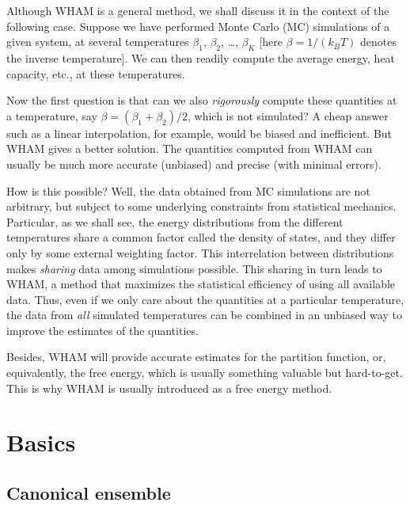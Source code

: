 \documentclass[aip,jcp,preprint,superscriptaddress]{revtex4-1}
\begin{document}
Although WHAM is a general method,
we shall discuss it in the context of the following case\cite{
ferrenberg1988, *ferrenberg1989, newman}.
%
Suppose we have performed Monte Carlo (MC) simulations of a given system,
at several temperatures $\beta_1$, $\beta_2$, \dots, $\beta_K$
%
[here $\beta = 1/(k_B T)$ denotes the inverse temperature].
%
We can then readily compute the average energy, heat capacity, etc.,
at these temperatures.


Now the first question is that
can we also \emph{rigorously} compute these quantities at a temperature,
say $\beta = (\beta_1 + \beta_2)/2$, which is not simulated?
%
A cheap answer such as a linear interpolation, for example,
would be biased and inefficient.
%
But WHAM gives a better solution.
%
The quantities computed from WHAM can usually be
much more accurate (unbiased)
and precise (with minimal errors).



How is this possible?
%
Well, the data obtained from MC simulations
are not arbitrary, but subject to
some underlying constraints from statistical mechanics.
%
Particular, as we shall see,
the energy distributions from the different temperatures
share a common factor called the density of states,
and they differ only by some external weighting factor.
%
This interrelation between distributions
makes \emph{sharing} data among simulations possible.
%
This sharing in turn leads to WHAM,
a method that maximizes the statistical efficiency
of using all available data.
%
Thus, even if we only care about the quantities
at a particular temperature,
the data from \emph{all} simulated temperatures
can be combined in an unbiased way
to improve the estimates of the quantities.



Besides, WHAM will provide accurate
estimates for the partition function,
or, equivalently, the free energy,
which is usually something valuable
but hard-to-get.
%
This is why WHAM is usually introduced
as a free energy method.




\section{\label{sec:basics}
Basics}



\subsection{Canonical ensemble}
\end{document}
